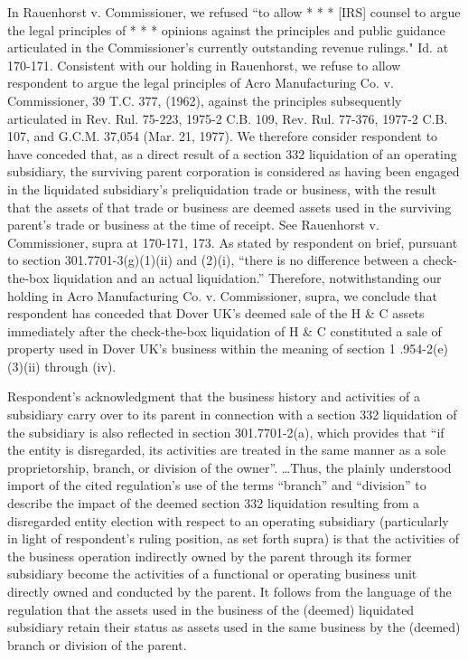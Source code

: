 \begin{select}
In Rauenhorst v. Commissioner, we refused ``to allow * * * [IRS] counsel to argue the legal principles of * * * opinions against the principles and public guidance articulated in the Commissioner's currently outstanding revenue rulings." Id. at 170-171. Consistent with our holding in Rauenhorst, we refuse to allow respondent to argue the legal principles of Acro Manufacturing Co. v. Commissioner, 39 T.C. 377, (1962), against the principles subsequently articulated in Rev. Rul. 75-223, 1975-2 C.B. 109, Rev. Rul. 77-376, 1977-2 C.B. 107, and G.C.M. 37,054 (Mar. 21, 1977). We therefore consider respondent to have conceded that, as a direct result of a section 332 liquidation of an operating subsidiary, the surviving parent corporation is considered as having been engaged in the liquidated subsidiary's preliquidation trade or business, with the
result that the assets of that trade or business are deemed assets used in the surviving parent's trade or business at the time of receipt. See Rauenhorst v. Commissioner, supra at 170-171, 173. As stated by respondent on brief, pursuant to section 301.7701-3(g)(1)(ii) and (2)(i), ``there is no difference between a check-the-box liquidation and an actual liquidation.''  Therefore, notwithstanding our holding in Acro Manufacturing Co. v. Commissioner, supra, we conclude that respondent has conceded that Dover UK's deemed sale of the H \& C assets immediately after the check-the-box liquidation of H \& C constituted a sale of property used in Dover UK's business within the meaning of section 1 .954-2(e)(3)(ii) through (iv).

Respondent's acknowledgment that the business history and activities of a subsidiary carry over to its parent in connection with a section 332 liquidation of the subsidiary is also reflected in section 301.7701-2(a), which provides that ``if the entity is disregarded, its activities are treated in the same manner as a sole proprietorship, branch, or division of the owner''. \ldots  Thus, the plainly understood import of the cited regulation's use of the terms ``branch'' and ``division'' to describe the impact of the deemed section 332 liquidation resulting from a disregarded entity election with respect to an operating subsidiary (particularly in light of respondent's ruling position, as set forth supra) is that the activities of the business operation indirectly owned by the parent through its former subsidiary become the
activities of a functional or operating business unit directly owned and conducted by the parent. It follows from the language of the regulation that the assets used in the business of the (deemed) liquidated subsidiary retain their status as assets used in the same business by the (deemed) branch or division of the parent.  


\end{select}
